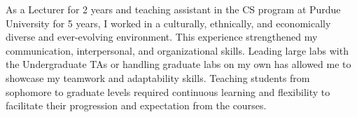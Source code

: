 \documentclass[10pt]{article}
\renewcommand*\paragraph[1]{}
\begin{document}

\paragraph{You should highlight your experience in teaching and mentoring students at different levels}
As a Lecturer for 2 years and teaching assistant in the CS program at Purdue University for 5 years, I worked in a culturally, ethnically, and economically diverse and ever-evolving environment. This experience strengthened my communication, interpersonal, and organizational skills. 
Leading large labs with the Undergraduate TAs or handling graduate labs on my own has allowed me to showcase my teamwork and adaptability skills. Teaching students from sophomore to graduate levels required continuous learning and flexibility to facilitate their progression and expectation from the courses.
%
\end{document}
